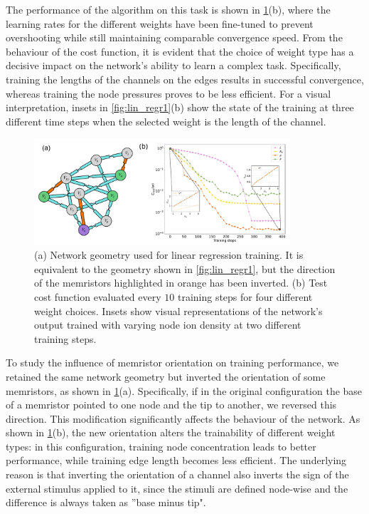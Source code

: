 \documentclass[reprint,superscriptaddress,prb,showkeys]{revtex4-2}
\begin{document}
The performance of the algorithm on this task is shown in \cref{fig:lin_regr2}(b), where the learning rates for the different weights have been fine-tuned to prevent overshooting while still maintaining comparable convergence speed. From the behaviour of the cost function, it is evident that the choice of weight type has a decisive impact on the network’s ability to learn a complex task. Specifically, training the lengths of the channels on the edges results in successful convergence, whereas training the node pressures proves to be less efficient. For a visual interpretation, insets in \cref{fig:lin_regr1}(b) show the state of the training at three different time steps when the selected weight is the length of the channel.
\begin{figure}[t]
    \centering
    \includegraphics[width=0.85\textwidth]{plots/regression/regression_G00010002.pdf}
    \caption{(a) Network geometry used for linear regression training. It is equivalent to the geometry shown in \cref{fig:lin_regr1}, but the direction of the memristors highlighted in orange has been inverted. (b) Test cost function evaluated every $10$ training steps for four different weight choices. Insets show visual representations of the network’s output trained with varying node ion density at two different training steps.}\label{fig:lin_regr2}
\end{figure} 

To study the influence of memristor orientation on training performance, we retained the same network geometry but inverted the orientation of some memristors, as shown in \cref{fig:lin_regr2}(a). Specifically, if in the original configuration the base of a memristor pointed to one node and the tip to another, we reversed this direction. This modification significantly affects the behaviour of the network. As shown in \cref{fig:lin_regr2}(b), the new orientation alters the trainability of different weight types: in this configuration, training node concentration leads to better performance, while training edge length becomes less efficient. The underlying reason is that inverting the orientation of a channel also inverts the sign of the external stimulus applied to it, since the stimuli are defined node-wise and the difference is always taken as ''base minus tip".
\end{document}
